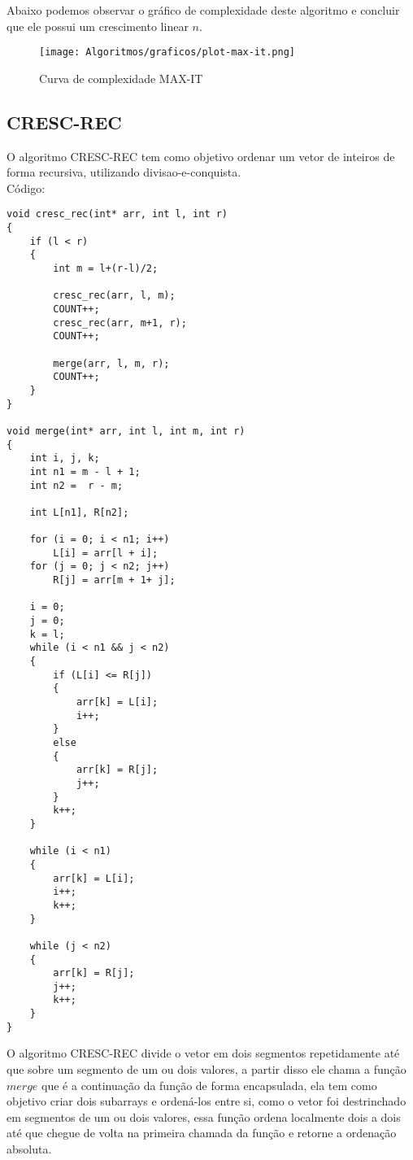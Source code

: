 \documentclass[a4paper, 12pt]{article}
\begin{document}
Abaixo podemos observar o gráfico de complexidade deste algoritmo e concluir que ele possui um crescimento linear $n$.

\begin{figure}[h]
	\centering
	\texttt{[image: Algoritmos/graficos/plot-max-it.png]}
	\caption{Curva de complexidade MAX-IT}
	\label{fig:max-it}
\end{figure}

\newpage

\subsection{CRESC-REC}

O algoritmo CRESC-REC tem como objetivo ordenar um vetor de inteiros de forma recursiva, utilizando divisao-e-conquista.\\


Código:

\begin{lstlisting}
void cresc_rec(int* arr, int l, int r)
{
    if (l < r)
    {
        int m = l+(r-l)/2;
 
        cresc_rec(arr, l, m);
        COUNT++;
        cresc_rec(arr, m+1, r);
        COUNT++;
 		
        merge(arr, l, m, r);
        COUNT++;
    }
}

void merge(int* arr, int l, int m, int r)
{
    int i, j, k;
    int n1 = m - l + 1;
    int n2 =  r - m;
 
    int L[n1], R[n2]; 

    for (i = 0; i < n1; i++)
        L[i] = arr[l + i];
    for (j = 0; j < n2; j++)
        R[j] = arr[m + 1+ j];
 
    i = 0; 
    j = 0; 
    k = l;
    while (i < n1 && j < n2)
    {
        if (L[i] <= R[j])
        {
            arr[k] = L[i];
            i++;
        }
        else
        {
            arr[k] = R[j];
            j++;
        }
        k++;
    }

    while (i < n1)
    {
        arr[k] = L[i];
        i++;
        k++;
    }
 
    while (j < n2)
    {
        arr[k] = R[j];
        j++;
        k++;
    }
}
\end{lstlisting}

O algoritmo CRESC-REC divide o vetor em dois segmentos repetidamente até que sobre um segmento de um ou dois valores, a partir disso ele chama a função $merge$ que é a continuação da função de forma encapsulada, ela tem como objetivo criar dois subarrays e ordená-los entre si, como o vetor foi destrinchado em segmentos de um ou dois valores, essa função ordena localmente dois a dois até que chegue de volta na primeira chamada da função e retorne a ordenação absoluta.
\end{document}
